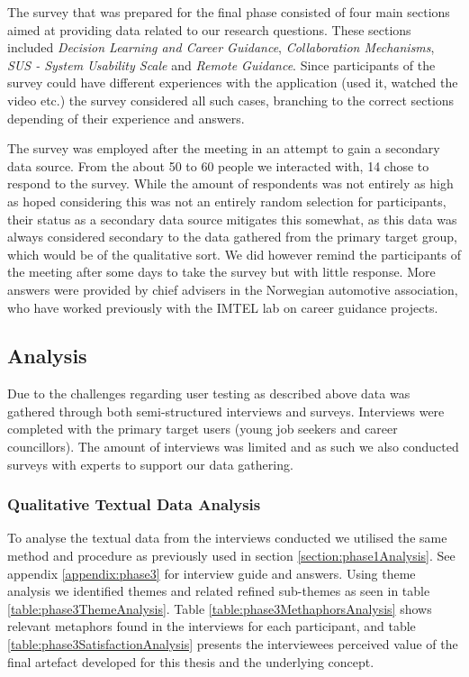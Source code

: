 The survey that was prepared for the final phase consisted of four main sections aimed at providing data related to our research questions. These sections included \textit{Decision Learning and Career Guidance}, \textit{Collaboration Mechanisms}, \textit{SUS - System Usability Scale} and \textit{Remote Guidance}. Since participants of the survey could have different experiences with the application (used it, watched the video etc.) the survey considered all such cases, branching to the correct sections depending of their experience and answers. 

The survey was employed after the meeting in an attempt to gain a secondary data source. From the about 50 to 60 people we interacted with, 14 chose to respond to the survey. While the amount of respondents was not entirely as high as hoped considering this was not an entirely random selection for participants, their status as a secondary data source mitigates this somewhat, as this data was always considered secondary to the data gathered from the primary target group, which would be of the qualitative sort. We did however remind the participants of the meeting after some days to take the survey but with little response. More answers were provided by chief advisers in the Norwegian automotive association, who have worked previously with the IMTEL lab on career guidance projects.    



\subsection{Analysis}
Due to the challenges regarding user testing as described above data was gathered through both semi-structured interviews and surveys. Interviews were completed with the primary target users (young job seekers and career councillors). The amount of interviews was limited and as such we also conducted surveys with experts to support our data gathering.      


\subsubsection{Qualitative Textual Data Analysis}
To analyse the textual data from the interviews conducted we utilised the same method and procedure as previously used in section \ref{section:phase1Analysis}. See appendix \ref{appendix:phase3} for interview guide and answers. Using theme analysis we identified themes and  related refined sub-themes as seen in table \ref{table:phase3ThemeAnalysis}. Table \ref{table:phase3MethaphorsAnalysis} shows relevant metaphors found in the interviews for each participant, and table \ref{table:phase3SatisfactionAnalysis} presents the interviewees perceived value of the final artefact developed for this thesis and the underlying concept.


